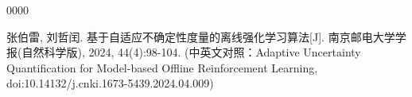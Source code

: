 \begin{publications}{0000}

    \item [{[1]}] 张伯雷, 刘哲闰. 基于自适应不确定性度量的离线强化学习算法[J]. 南京邮电大学学报(自然科学版), 2024, 44(4):98-104. (中英文对照：Adaptive Uncertainty Quantification for Model-based Offline Reinforcement Learning, doi:10.14132/j.cnki.1673-5439.2024.04.009)


\end{publications}










